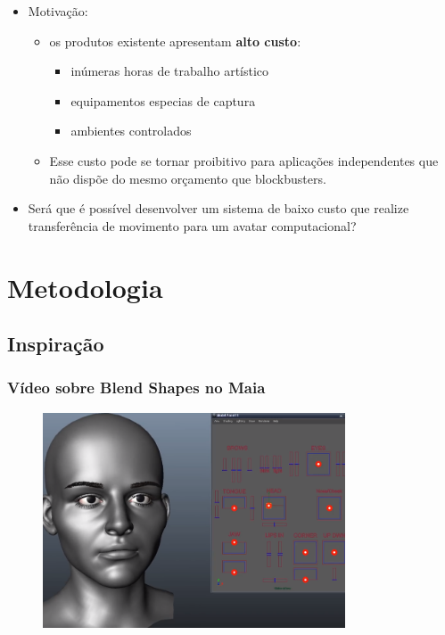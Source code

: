 \documentclass[brazil]{beamer}
\begin{document}
\begin{frame}
  \begin{itemize}
      \item Motivação:
      \begin{itemize}
        \item os produtos existente apresentam \textbf{alto custo}: 
          \begin{itemize}
            \item inúmeras horas de trabalho artístico
            \item equipamentos especias de captura
            \item ambientes controlados
          \end{itemize}
        \item Esse custo pode se tornar proibitivo para aplicações
          independentes que não dispõe do mesmo orçamento que blockbusters.
      \end{itemize}   
      \item Será que é possível desenvolver um sistema de baixo custo que
        realize transferência de movimento para um avatar computacional?
  \end{itemize} 

\end{frame}


\section{Metodologia}

\subsection{Inspiração}
\begin{frame}
	\frametitle{Vídeo sobre Blend Shapes no Maia}
      \begin{figure}
        \centering
        \includegraphics[width = 0.8\textwidth, keepaspectratio]{./img/maiaDemo.png}
      \end{figure}   
\end{frame}
\end{document}
